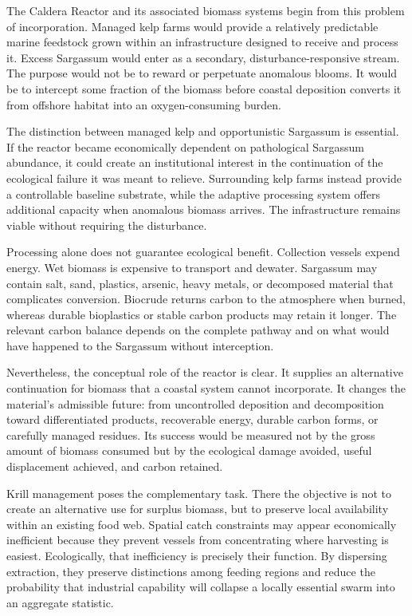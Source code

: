 \documentclass[11pt,oneside]{book}
\begin{document}
The Caldera Reactor and its associated biomass systems begin from this problem of incorporation. Managed kelp farms would provide a relatively predictable marine feedstock grown within an infrastructure designed to receive and process it. Excess Sargassum would enter as a secondary, disturbance-responsive stream. The purpose would not be to reward or perpetuate anomalous blooms. It would be to intercept some fraction of the biomass before coastal deposition converts it from offshore habitat into an oxygen-consuming burden.

The distinction between managed kelp and opportunistic Sargassum is essential. If the reactor became economically dependent on pathological Sargassum abundance, it could create an institutional interest in the continuation of the ecological failure it was meant to relieve. Surrounding kelp farms instead provide a controllable baseline substrate, while the adaptive processing system offers additional capacity when anomalous biomass arrives. The infrastructure remains viable without requiring the disturbance.

Processing alone does not guarantee ecological benefit. Collection vessels expend energy. Wet biomass is expensive to transport and dewater. Sargassum may contain salt, sand, plastics, arsenic, heavy metals, or decomposed material that complicates conversion. Biocrude returns carbon to the atmosphere when burned, whereas durable bioplastics or stable carbon products may retain it longer. The relevant carbon balance depends on the complete pathway and on what would have happened to the Sargassum without interception.

Nevertheless, the conceptual role of the reactor is clear. It supplies an alternative continuation for biomass that a coastal system cannot incorporate. It changes the material's admissible future: from uncontrolled deposition and decomposition toward differentiated products, recoverable energy, durable carbon forms, or carefully managed residues. Its success would be measured not by the gross amount of biomass consumed but by the ecological damage avoided, useful displacement achieved, and carbon retained.

Krill management poses the complementary task. There the objective is not to create an alternative use for surplus biomass, but to preserve local availability within an existing food web. Spatial catch constraints may appear economically inefficient because they prevent vessels from concentrating where harvesting is easiest. Ecologically, that inefficiency is precisely their function. By dispersing extraction, they preserve distinctions among feeding regions and reduce the probability that industrial capability will collapse a locally essential swarm into an aggregate statistic.
\end{document}

